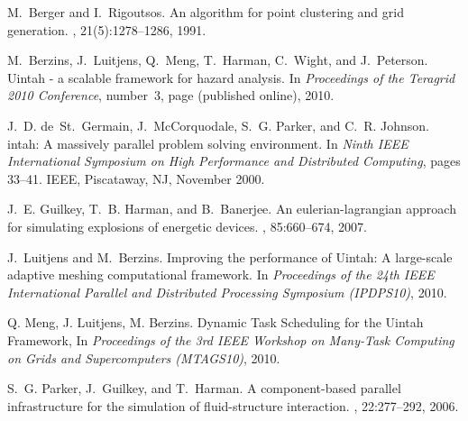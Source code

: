 
\begin{thebibliography}{10}

M.~Berger and I.~Rigoutsos.
\newblock An algorithm for point clustering and grid generation.
, 21(5):1278--1286, 1991.

M.~Berzins, J.~Luitjens, Q.~Meng, T.~Harman, C.~Wight, and J.~Peterson.
\newblock Uintah - a scalable framework for hazard analysis.
\newblock In {\em Proceedings of the Teragrid 2010 Conference}, number~3, page
  (published online), 2010.

J.~D. de~St.~Germain, J.~McCorquodale, S.~G. Parker, and C.~R. Johnson.
intah: {A} massively parallel problem solving environment.
\newblock In {\em Ninth {IEEE} International Symposium on High Performance and
  Distributed Computing}, pages 33--41. {IEEE}, Piscataway, NJ, November 2000.

J.~E. Guilkey, T.~B. Harman, and B.~Banerjee.
\newblock An eulerian-lagrangian approach for simulating explosions of
  energetic devices.
, 85:660--674, 2007.
 
J.~Luitjens and M.~Berzins.
\newblock Improving the performance of {U}intah: {A} large-scale adaptive
  meshing computational framework.
\newblock In {\em Proceedings of the 24th IEEE International Parallel and
  Distributed Processing Symposium (IPDPS10)}, 2010. 

Q. Meng, J. Luitjens, M. Berzins. 
\newblock Dynamic Task Scheduling for the Uintah Framework, 
\newblock In {\em Proceedings of the 3rd IEEE Workshop on Many-Task Computing on Grids and Supercomputers (MTAGS10)}, 2010.

S.~G. Parker, J.~Guilkey, and T.~Harman.
\newblock A component-based parallel infrastructure for the simulation of
  fluid-structure interaction.
, 22:277--292, 2006.

\end{thebibliography}

